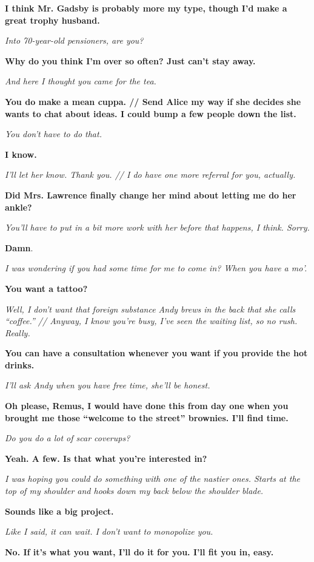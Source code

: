 \textbf{I think Mr. Gadsby is probably more my type, though I’d make a great trophy husband.
}

\textit{Into 70-year-old pensioners, are you?
}

\textbf{Why do you think I’m over so often? Just can’t stay away.
}

\textit{And here I thought you came for the tea.
}

\textbf{You do make a mean cuppa. // Send Alice my way if she decides she wants to chat about ideas. I could bump a few people down the list.
}

\textit{You don’t have to do that.
}

\textbf{I know.
}

\textit{I’ll let her know. Thank you. // I do have one more referral for you, actually.
}

\textbf{Did Mrs. Lawrence finally change her mind about letting me do her ankle?
}

\textit{You’ll have to put in a bit more work with her before that happens, I think. Sorry.
}

\textbf{Damn}.

\textit{I was wondering if you had some time for me to come in? When you have a mo’.
}

\textbf{You want a tattoo?
}

\textit{Well, I don’t want that foreign substance Andy brews in the back that she calls “coffee.” // Anyway, I know you’re busy, I’ve seen the waiting list, so no rush. Really.
}

\textbf{You can have a consultation whenever you want if you provide the hot drinks.
}

\textit{I’ll ask Andy when you have free time, she’ll be honest.
}

\textbf{Oh please, Remus, I would have done this from day one when you brought me those “welcome to the street” brownies. I’ll find time.
}

\textit{Do you do a lot of scar coverups?
}

\textbf{Yeah. A few. Is that what you’re interested in?
}

\textit{I was hoping you could do something with one of the nastier ones. Starts at the top of my shoulder and hooks down my back below the shoulder blade.
}

\textbf{Sounds like a big project.
}

\textit{Like I said, it can wait. I don’t want to monopolize you.
}

\textbf{No. If it’s what you want, I’ll do it for you. I’ll fit you in, easy.
}

